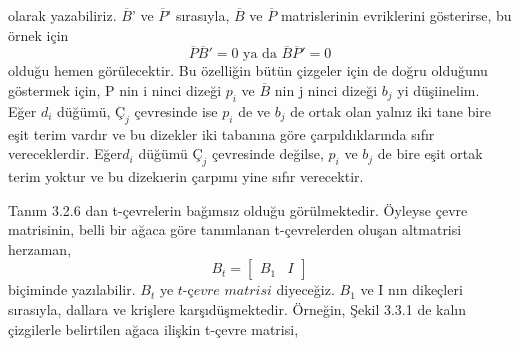 \documentclass[11pt]{amsbook}
\begin{document}


olarak yazabiliriz. $\overline{B}$' ve $\overline{P}$' sırasıyla, $\overline{B}$ ve $\overline{P}$ 
matrislerinin evriklerini gösterirse, bu örnek için 
\begin{equation*}
\overline{P}\overline{B}' = 0 \text{ ya da } \overline{B}\overline{P}' = 0
\end{equation*}
olduğu hemen görülecektir. Bu özelliğin bütün  
çizgeler için de doğru olduğunu göstermek için, 
P nin i ninci dizeği $p_i$ ve $\overline{B}$ nin j ninci dizeği 
$b_j$ yi düşiinelim. Eğer $d_i$ düğümü, $Ç_j$ çevresinde 
ise $p_i$ de ve $b_j$ de ortak olan yalnız iki tane bire 
eşit terim vardır ve bu dizekler iki tabanına göre 
çarpıldıklarında sıfır vereceklerdir. Eğer$d_i$
düğümü $Ç_j$ çevresinde değilse, $p_i$ ve $b_j$ de bire 
eşit ortak terim yoktur ve bu dizekıerin çarpımı 
yine sıfır verecektir.

Tanım 3.2.6 dan t-çevrelerin bağımsız olduğu 
görülmektedir. Öyleyse çevre matrisinin, belli 
bir ağaca göre tanımlanan t-çevrelerden oluşan 
altmatrisi herzaman, 
\begin{equation*}
B_t =
  \begin{bmatrix}

B_1 & I

  \end{bmatrix}
\end{equation*}
biçiminde yazılabilir. $B_t$ ye $\textit{t-çevre matrisi}$
diyeceğiz. $B_1$ ve I nın dikeçleri sırasıyla,
dallara ve krişlere karşıdüşmektedir. Örneğin,
Şekil 3.3.1 de kalın çizgilerle belirtilen ağaca ilişkin t-çevre matrisi,
\end{document}
